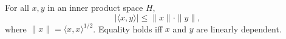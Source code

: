 For all $x, y$ in an inner product space $H$,
$$|\langle x, y \rangle| \leq \|x\| \cdot \|y\|,$$
where $\|x\| = \langle x, x \rangle^{1/2}$. Equality holds iff $x$ and $y$ are linearly dependent.
